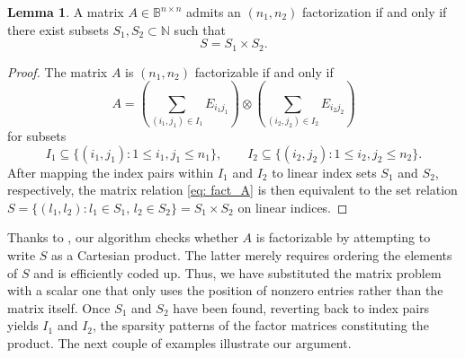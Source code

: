 \documentclass{article}
\numberwithin{equation}{section}
\theoremstyle{definition}
\newtheorem{lemma}[definition]{Lemma}
\begin{document}
\begin{lemma}
\label{lem: equivalency}
A matrix $A \in \mathbb{B}^{n \times n}$ admits an $(n_1,n_2)$ factorization if and only if there exist subsets $S_1,S_2 \subset \mathbb{N}$ such that
\begin{equation*}
    S = S_1 \times S_2.
\end{equation*}
\end{lemma}
\begin{proof}
The matrix $A$ is $(n_1,n_2)$ factorizable if and only if
\begin{equation}
\label{eq: fact_A}
    A = \left(\sum_{(i_1,j_1) \in I_1} E_{i_1j_1}\right) \otimes \left(\sum_{(i_2,j_2) \in I_2} E_{i_2j_2}\right)
\end{equation}
for subsets
\begin{equation*}
    I_1 \subseteq \{(i_1,j_1) \colon 1 \leq i_1,j_1 \leq n_1\}, \qquad I_2 \subseteq \{(i_2,j_2) \colon 1 \leq i_2,j_2 \leq n_2\}.
\end{equation*}
After mapping the index pairs within $I_1$ and $I_2$ to linear index sets $S_1$ and $S_2$, respectively, the matrix relation \eqref{eq: fact_A} is then equivalent to the set relation $S = \{(l_1,l_2) \colon l_1 \in S_1,\, l_2 \in S_2\} = S_1 \times S_2$ on linear indices.
\end{proof}

Thanks to , our algorithm checks whether $A$ is factorizable by attempting to write $S$ as a Cartesian product. The latter merely requires ordering the elements of $S$ and is efficiently coded up. Thus, we have substituted the matrix problem with a scalar one that only uses the position of nonzero entries rather than the matrix itself. Once $S_1$ and $S_2$ have been found, reverting back to index pairs yields $I_1$ and $I_2$, the sparsity patterns of the factor matrices constituting the product. The next couple of examples illustrate our argument.
\end{document}
